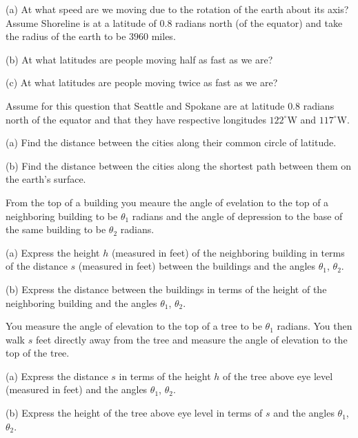 \documentclass{ximera}
\begin{document}
\begin{question}  \label{Qdegb574}
(a) At what speed are we moving due to the rotation of the earth about its axis? Assume Shoreline is at a latitude of $0.8$ radians
north (of the equator) and take the radius of the earth to be $3960$ miles.

(b) At what latitudes are people moving half as fast as we are?

(c) At what latitudes are people moving twice as fast as we are?

\end{question}

\begin{question} \label{Q34ft45rtg}
Assume for this question that Seattle and Spokane are at latitude $0.8$ radians north of the equator and that they have respective longitudes $122^\circ$W and $117^\circ$W.

(a) Find the distance between the cities along their common circle of latitude.

(b) Find the distance between the cities along the shortest path between them on the earth's surface.

\end{question}


\begin{question}  \label{Qewrdfg67}
From the top of a building you meaure the angle of evelation to the top of a neighboring building to be $\theta_1$ radians and the angle of depression to the base of the same building to be $\theta_2$ radians.

(a) Express the height $h$ (measured in feet) of the neighboring building in terms of the distance $s$ (measured in feet) between the buildings and the angles $\theta_1$, $\theta_2$.

(b) Express the distance between the buildings in terms of the height of the neighboring building and the angles $\theta_1$, $\theta_2$.

\end{question}

\begin{question}  \label{Qerdft543}
You measure the angle of elevation to the top of a tree to be $\theta_1$ radians. You then walk $s$ feet directly away from the tree and measure the angle of elevation to the top of the tree.

(a) Express the distance $s$ in terms of the height $h$ of the tree above eye level (measured in feet) and the angles $\theta_1$, $\theta_2$.

(b) Express the height of the tree above eye level in terms of $s$ and the angles $\theta_1$, $\theta_2$.
\end{question}
\end{document}

